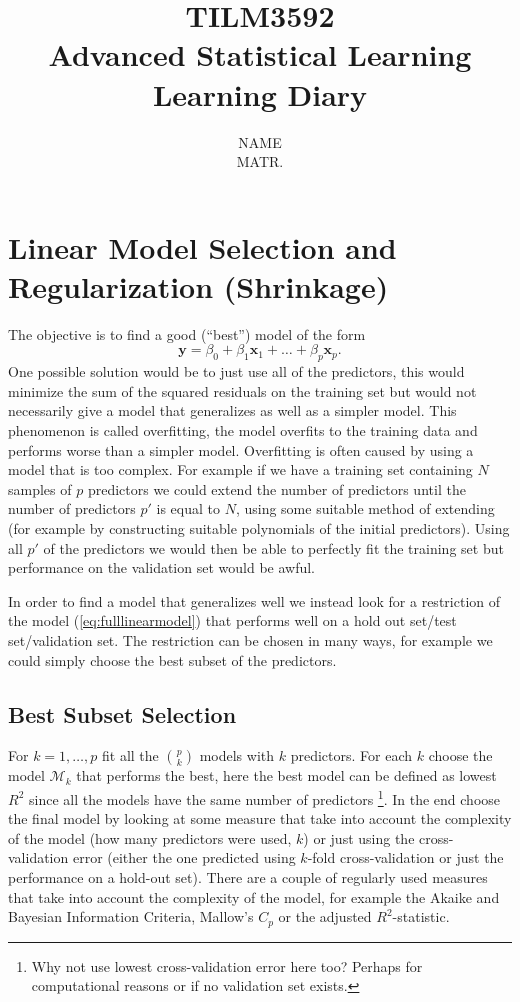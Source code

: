 \documentclass[a4paper, 12pt]{scrartcl}
\title{{\LARGE \textbf{TILM3592\\Advanced Statistical Learning}}\\{\Large \bfseries Learning Diary}}
\author{{\large NAME}\\
{ MATR.}}
\date{}
\begin{document}
\maketitle


\section{Linear Model Selection and Regularization (Shrinkage)}

The objective is to find a good (``best'') model of the form
\begin{equation}\label{eq:fulllinearmodel}
	\mathbf{y}=\beta_0+\beta_1\mathbf{x}_1+\ldots+\beta_p\mathbf{x}_p.
\end{equation}
One possible solution would be to just use all of the predictors, this would minimize the sum of the squared residuals on the training set but would not necessarily give a model that generalizes as well as a simpler model. This phenomenon is called overfitting, the model overfits to the training data and performs worse than a simpler model. Overfitting is often caused by using a model that is too complex. For example if we have a training set containing $N$ samples of $p$ predictors we could extend the number of predictors until the number of predictors $p'$ is equal to $N$, using some suitable method of extending (for example by constructing suitable polynomials of the initial predictors). Using all $p'$ of the predictors we would then be able to perfectly fit the training set but performance on the validation set would be awful.

In order to find a model that generalizes well we instead look for a restriction of the model (\ref{eq:fulllinearmodel}) that performs well on a hold out set/test set/validation set. The restriction can be chosen in many ways, for example we could simply choose the best subset of the predictors.

\subsection{Best Subset Selection}
For $k=1,\ldots,p$ fit all the ${p \choose k}$ models with $k$ predictors. For each $k$ choose the model $\mathcal{M}_k$ that performs the best, here the best model can be defined as lowest $R^2$ since all the models have the same number of predictors \footnote{Why not use lowest cross-validation error here too? Perhaps for computational reasons or if no validation set exists.}. In the end choose the final model by looking at some measure that take into account the complexity of the model (how many predictors were used, $k$) or just using the cross-validation error (either the one predicted using $k$-fold cross-validation or just the performance on a hold-out set). There are a couple of regularly used measures that take into account the complexity of the model, for example the Akaike and Bayesian Information Criteria, Mallow's $C_p$ or the adjusted $R^2$-statistic.
\end{document}
